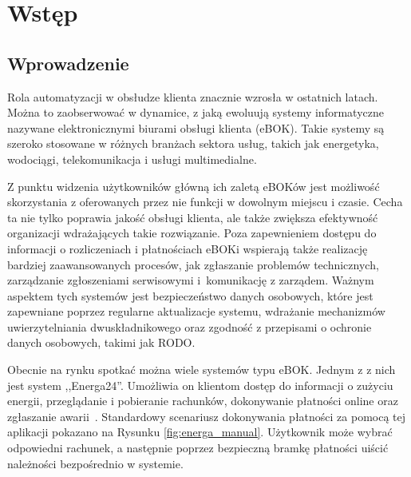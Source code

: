 \chapter{Wstęp}
\section{Wprowadzenie}
Rola automatyzacji w obsłudze klienta znacznie wzrosła w ostatnich latach. Można to zaobserwować w dynamice, z jaką ewoluują systemy informatyczne nazywane elektronicznymi biurami obsługi klienta (eBOK). Takie systemy są szeroko stosowane w różnych branżach sektora usług, takich jak energetyka, wodociągi, telekomunikacja i usługi multimedialne.

Z punktu widzenia użytkowników główną ich zaletą eBOKów jest możliwość skorzystania z oferowanych przez nie funkcji w dowolnym miejscu i czasie. Cecha ta nie tylko poprawia jakość obsługi klienta, ale także zwiększa efektywność organizacji wdrażających takie rozwiązanie. Poza zapewnieniem dostępu do informacji o rozliczeniach i płatnościach eBOKi wspierają także realizację bardziej zaawansowanych procesów, jak zgłaszanie problemów technicznych, zarządzanie zgłoszeniami serwisowymi i~komunikację z zarządem. Ważnym aspektem tych systemów jest bezpieczeństwo danych osobowych, które jest zapewniane poprzez regularne aktualizacje systemu, wdrażanie mechanizmów uwierzytelniania dwuskładnikowego oraz zgodność z przepisami o ochronie danych osobowych, takimi jak RODO.

Obecnie na rynku spotkać można wiele systemów typu eBOK. Jednym z z nich jest system ,,Energa24''. Umożliwia on klientom dostęp do informacji o zużyciu energii, przeglądanie i pobieranie rachunków, dokonywanie płatności online oraz zgłaszanie awarii~\cite{energa}. Standardowy scenariusz dokonywania płatności za pomocą tej aplikacji pokazano na Rysunku \ref{fig:energa_manual}. Użytkownik może wybrać odpowiedni rachunek, a następnie poprzez bezpieczną bramkę płatności uiścić należności bezpośrednio w systemie.

